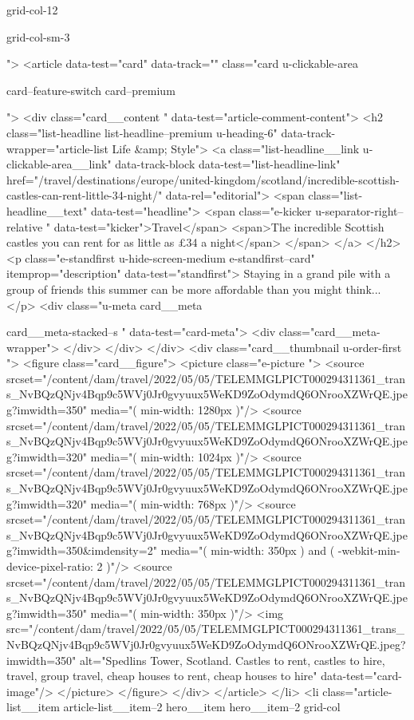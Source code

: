 {{{			
			
			
			grid-col-12
			
			
			
			
			
			grid-col-sm-3
			
			
			
			
			
			
			
			
			">
<article data-test="card" data-track="" class="card
			u-clickable-area
			
			card--feature-switch
			card--premium
			
			
			
			
			
			 ">
<div class="card__content " data-test="article-comment-content">
<h2 class="list-headline list-headline--premium u-heading-6" data-track-wrapper="article-list Life &amp; Style">
<a class="list-headline__link u-clickable-area__link" data-track-block data-test="list-headline-link" href="/travel/destinations/europe/united-kingdom/scotland/incredible-scottish-castles-can-rent-little-34-night/" data-rel="editorial">
<span class="list-headline__text" data-test="headline">
<span class="e-kicker u-separator-right--relative " data-test="kicker">Travel</span>
<span>The incredible Scottish castles you can rent for as little as £34 a night</span>
</span>
</a>
</h2>
<p class="e-standfirst u-hide-screen-medium e-standfirst--card" itemprop="description" data-test="standfirst">
Staying in a grand pile with a group of friends this summer can be more affordable than you might think...
</p>
<div class="u-meta card__meta
						
						card__meta-stacked--s
						" data-test="card-meta">
<div class="card__meta-wrapper">
</div>
</div>
</div>
<div class="card__thumbnail u-order-first ">
<figure class="card__figure">
<picture class="e-picture   ">
<source srcset="/content/dam/travel/2022/05/05/TELEMMGLPICT000294311361_trans_NvBQzQNjv4Bqp9c5WVj0Jr0gvyuux5WeKD9ZoOdymdQ6ONrooXZWrQE.jpeg?imwidth=350" media="( min-width: 1280px )"/>
<source srcset="/content/dam/travel/2022/05/05/TELEMMGLPICT000294311361_trans_NvBQzQNjv4Bqp9c5WVj0Jr0gvyuux5WeKD9ZoOdymdQ6ONrooXZWrQE.jpeg?imwidth=320" media="( min-width: 1024px )"/>
<source srcset="/content/dam/travel/2022/05/05/TELEMMGLPICT000294311361_trans_NvBQzQNjv4Bqp9c5WVj0Jr0gvyuux5WeKD9ZoOdymdQ6ONrooXZWrQE.jpeg?imwidth=320" media="( min-width: 768px )"/>
<source srcset="/content/dam/travel/2022/05/05/TELEMMGLPICT000294311361_trans_NvBQzQNjv4Bqp9c5WVj0Jr0gvyuux5WeKD9ZoOdymdQ6ONrooXZWrQE.jpeg?imwidth=350&imdensity=2" media="( min-width: 350px ) and ( -webkit-min-device-pixel-ratio: 2 )"/>
<source srcset="/content/dam/travel/2022/05/05/TELEMMGLPICT000294311361_trans_NvBQzQNjv4Bqp9c5WVj0Jr0gvyuux5WeKD9ZoOdymdQ6ONrooXZWrQE.jpeg?imwidth=350" media="( min-width: 350px )"/>
<img src="/content/dam/travel/2022/05/05/TELEMMGLPICT000294311361_trans_NvBQzQNjv4Bqp9c5WVj0Jr0gvyuux5WeKD9ZoOdymdQ6ONrooXZWrQE.jpeg?imwidth=350" alt="Spedlins Tower, Scotland. Castles to rent, castles to hire, travel, group travel, cheap houses to rent, cheap houses to hire" data-test="card-image"/>
</picture>
</figure>
</div>
</article>
</li>
<li class="article-list__item article-list__item--2 hero__item hero__item--2
			grid-col
			
}}}
